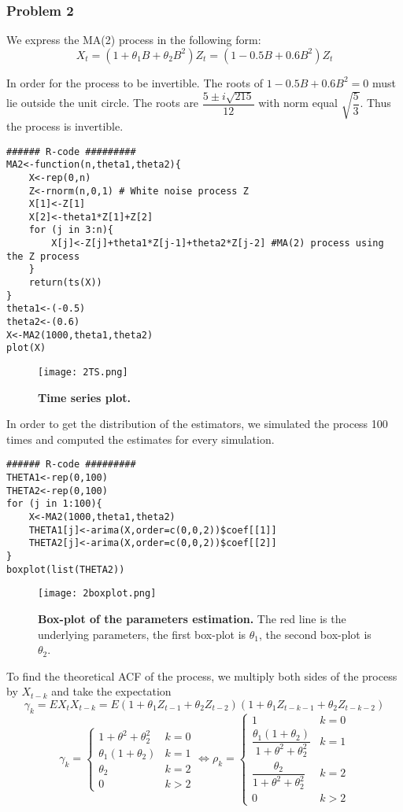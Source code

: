 \documentclass{article}
\begin{document}
\subsubsection*{Problem 2}
We express the MA(2) process in the following form:
\[
X_{t}=(1+\theta_1B+\theta_2 B^2)Z_{t}=(1-0.5B+0.6 B^2)Z_{t}
\]

In order for the process to be invertible. The roots of $1-0.5B+0.6 B^2=0$
must lie outside the unit circle. The roots are 
$\dfrac{5 \pm i \sqrt{215}}{12}
$ with norm equal $ \sqrt{\dfrac{5}{3}}$. Thus the process is invertible.

\begin{verbatim}
###### R-code #########
MA2<-function(n,theta1,theta2){
	X<-rep(0,n)
	Z<-rnorm(n,0,1) # White noise process Z
	X[1]<-Z[1]
	X[2]<-theta1*Z[1]+Z[2]
	for (j in 3:n){
		X[j]<-Z[j]+theta1*Z[j-1]+theta2*Z[j-2] #MA(2) process using the Z process
	}
	return(ts(X))
}
theta1<-(-0.5)
theta2<-(0.6)
X<-MA2(1000,theta1,theta2)
plot(X)
\end{verbatim}

\begin{figure}[H]
	\centering
  	\texttt{[image: 2TS.png]}
  	\caption{\textbf{Time series plot.} }
\end{figure}

In order to get the distribution of the estimators, we simulated the process 100 times and computed the estimates for every simulation. 

\begin{verbatim}
###### R-code #########
THETA1<-rep(0,100)
THETA2<-rep(0,100)
for (j in 1:100){
	X<-MA2(1000,theta1,theta2)
	THETA1[j]<-arima(X,order=c(0,0,2))$coef[[1]]
	THETA2[j]<-arima(X,order=c(0,0,2))$coef[[2]]
}
boxplot(list(THETA2))
\end{verbatim}

\begin{figure}[H]
	\centering
  	\texttt{[image: 2boxplot.png]}
  	\caption{\textbf{Box-plot of the parameters estimation.} The red line is the underlying parameters, the first box-plot is $\theta_1$, the second box-plot is $\theta_2$.}
\end{figure}


To find the theoretical ACF of the process, we multiply both sides of the process
by $X_{t-k}$ and take the expectation
\[
\gamma_k=EX_{t}X_{t-k}=E(1+\theta_1Z_{t-1}+\theta_2 Z_{t-2})(1+\theta_1Z_{t-k-1}+\theta_2 Z_{t-k-2})
\]
$$
\gamma_k=
\left\{
\begin{array}{cc}
1+\theta^2+\theta_2^2 & k=0 \\
 \theta_1(1+\theta_2) & k=1\\
 \theta_2 & k=2\\
 0 & k>2
\end{array}
\right.
\iff
\rho_k=
\left\{
\begin{array}{ccccc}
 1 & k=0 \\
 \dfrac{\theta_1(1+\theta_2)}{1+\theta^2+\theta_2^2} & k=1\\
 \dfrac{\theta_2}{1+\theta^2+\theta_2^2} & k=2\\
 0 & k>2
    \end{array}
\right. 
$$
\end{document}

